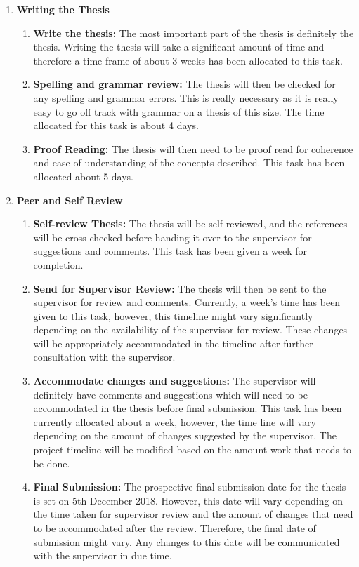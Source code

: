 \documentclass[a4paper,twoside,phd]{BYUPhys}
\begin{document}
\begin{enumerate}
\begin{enumerate}
    \end{enumerate}
    \item \textbf{Writing the Thesis}
    \begin{enumerate}
        \item \textbf{Write the thesis:} The most important part of the thesis is definitely the thesis. Writing the thesis will take a significant amount of time and therefore a time frame of about 3 weeks has been allocated to this task.
        \item \textbf{Spelling and grammar review:} The thesis will then be checked for any spelling and grammar errors. This is really necessary as it is really easy to go off track with grammar on a thesis of this size. The time allocated for this task is about 4 days.
        \item \textbf{Proof Reading:} The thesis will then need to be proof read for coherence and ease of understanding of the concepts described. This task has been allocated about 5 days.
    \end{enumerate}
    \item \textbf{Peer and Self Review}
    \begin{enumerate}
        \item \textbf{Self-review Thesis:} The thesis will be self-reviewed, and the references will be cross checked before handing it over to the supervisor for suggestions and comments. This task has been given a week for completion.
        \item \textbf{Send for Supervisor Review:} The thesis will then be sent to the supervisor for
        review and comments. Currently, a week’s time has been given to this task, however, this timeline might vary significantly depending on the availability of the supervisor for review. These changes will be appropriately accommodated in the timeline after further consultation with the supervisor.
        \item \textbf{Accommodate changes and suggestions:} The supervisor will definitely have comments and suggestions which will need to be accommodated in the thesis before final submission. This task has been currently allocated about a week, however, the time line will vary depending on the amount of changes suggested by the supervisor. The project timeline will be modified based on the amount work that needs to be done.
        \item \textbf{Final Submission:} The prospective final submission date for the thesis is set on 5th December 2018. However, this date will vary depending on the time taken for supervisor review and the amount of changes that need to be accommodated after the review. Therefore, the final date of submission might vary. Any changes to this date will be communicated with the supervisor in due time.
    \end{enumerate}
\end{enumerate}
\end{document}
